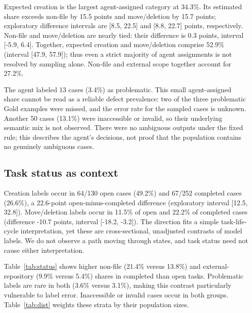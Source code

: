 \documentclass[10pt,conference]{IEEEtran}
\begin{document}
Expected creation is the largest agent-assigned category at 34.3\%. Its estimated share exceeds non-file by 15.5 points and move/deletion by 15.7 points; exploratory difference intervals are [8.5, 22.5] and [8.8, 22.7] points, respectively. Non-file and move/deletion are nearly tied: their difference is 0.3 points, interval [-5.9, 6.4]. Together, expected creation and move/deletion comprise 52.9\% (interval [47.9, 57.9]); thus even a strict majority of agent assignments is not resolved by sampling alone. Non-file and external scope together account for 27.2\%.

The agent labeled 13 cases (3.4\%) as problematic. This small agent-assigned share cannot be read as a reliable defect prevalence: two of the three problematic Gold examples were missed, and the error rate for the sampled cases is unknown. Another 50 cases (13.1\%) were inaccessible or invalid, so their underlying semantic mix is not observed. There were no ambiguous outputs under the fixed rule; this describes the agent's decisions, not proof that the population contains no genuinely ambiguous cases.

\subsection{Task status as context}
Creation labels occur in 64/130 open cases (49.2\%) and 67/252 completed cases (26.6\%), a 22.6-point open-minus-completed difference (exploratory interval [12.5, 32.8]). Move/deletion labels occur in 11.5\% of open and 22.2\% of completed cases (difference -10.7 points, interval [-18.2, -3.2]). The direction fits a simple task-life-cycle interpretation, yet these are cross-sectional, unadjusted contrasts of model labels. We do not observe a path moving through states, and task status need not cause either interpretation.

Table~\ref{tab:status} shows higher non-file (21.4\% versus 13.8\%) and external-repository (9.9\% versus 5.4\%) shares in completed than open tasks. Problematic labels are rare in both (3.6\% versus 3.1\%), making this contrast particularly vulnerable to label error. Inaccessible or invalid cases occur in both groups. Table~\ref{tab:dist} weights these strata by their population sizes.
\end{document}
